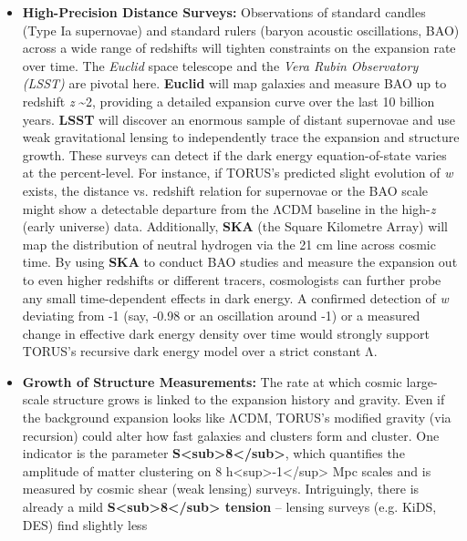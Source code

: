 \documentclass[
]{article}
\begin{document}
\begin{itemize}
\item
  \textbf{High-Precision Distance Surveys:} Observations of standard
  candles (Type Ia supernovae) and standard rulers (baryon acoustic
  oscillations, BAO) across a wide range of redshifts will tighten
  constraints on the expansion rate over time. The \emph{Euclid} space
  telescope and the \emph{Vera Rubin Observatory (LSST)} are pivotal
  here. \textbf{Euclid} will map galaxies and measure BAO up to redshift
  \emph{z} \textasciitilde2, providing a detailed expansion curve over
  the last 10 billion years. \textbf{LSST} will discover an enormous
  sample of distant supernovae and use weak gravitational lensing to
  independently trace the expansion and structure growth. These surveys
  can detect if the dark energy equation-of-state varies at the
  percent-level. For instance, if TORUS's predicted slight evolution of
  \emph{w} exists, the distance vs. redshift relation for supernovae or
  the BAO scale might show a detectable departure from the ΛCDM baseline
  in the high-\emph{z} (early universe) data\hspace{0pt}. Additionally,
  \textbf{SKA} (the Square Kilometre Array) will map the distribution of
  neutral hydrogen via the 21 cm line across cosmic time. By using
  \textbf{SKA} to conduct BAO studies and measure the expansion out to
  even higher redshifts or different tracers, cosmologists can further
  probe any small time-dependent effects in dark energy\hspace{0pt}. A
  confirmed detection of \emph{w} deviating from -1 (say, -0.98 or an
  oscillation around -1) or a measured change in effective dark energy
  density over time would strongly support TORUS's recursive dark energy
  model over a strict constant Λ.
\item
  \textbf{Growth of Structure Measurements:} The rate at which cosmic
  large-scale structure grows is linked to the expansion history and
  gravity. Even if the background expansion looks like ΛCDM, TORUS's
  modified gravity (via recursion) could alter how fast galaxies and
  clusters form and cluster. One indicator is the parameter
  \textbf{S\textless sub\textgreater8\textless/sub\textgreater{}}, which
  quantifies the amplitude of matter clustering on 8
  h\textless sup\textgreater-1\textless/sup\textgreater{} Mpc scales and
  is measured by cosmic shear (weak lensing) surveys. Intriguingly,
  there is already a mild
  \textbf{S\textless sub\textgreater8\textless/sub\textgreater{}
  tension} -- lensing surveys (e.g. KiDS, DES) find slightly less

\end{itemize}
\end{document}
